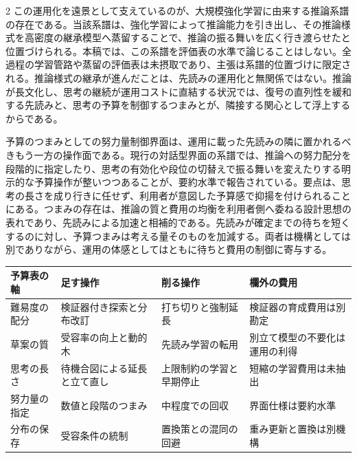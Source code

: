 \documentclass[lualatex,a4paper,10pt]{jlreq}
\begin{document}
\begin{multicols}{2}
この運用化を遠景として支えているのが、大規模強化学習に由来する推論系譜の存在である。当該系譜は、強化学習によって推論能力を引き出し、その推論様式を高密度の継承模型へ蒸留することで、推論の振る舞いを広く行き渡らせたと位置づけられる\autocite{r1}。本稿では、この系譜を評価表の水準で論じることはしない。全過程の学習管路や蒸留の評価表は未摂取であり、主張は系譜的位置づけに限定される。推論様式の継承が進んだことは、先読みの運用化と無関係ではない。推論が長文化し、思考の継続が運用コストに直結する状況では、復号の直列性を緩和する先読みと、思考の予算を制御するつまみとが、隣接する関心として浮上するからである。

予算のつまみとしての努力量制御界面は、運用に載った先読みの隣に置かれるべきもう一方の操作面である。現行の対話型界面の系譜では、推論への努力配分を段階的に指定したり、思考の有効化や段位の切替えで振る舞いを変えたりする明示的な予算操作が整いつつあることが、要約水準で報告されている\autocite{effortbind}。要点は、思考の長さを成り行きに任せず、利用者が意図した予算感で抑揚を付けられることにある。つまみの存在は、推論の質と費用の均衡を利用者側へ委ねる設計思想の表れであり、先読みによる加速と相補的である。先読みが確定までの待ちを短くするのに対し、予算つまみは考える量そのものを加減する。両者は機構としては別でありながら、運用の体感としてはともに待ちと費用の制御に寄与する。

\end{multicols}

\begin{center}
\small
\begin{tabularx}{\textwidth}{@{}p{}p{}p{}X@{}}
\toprule
予算表の軸 & 足す操作 & 削る操作 & 欄外の費用 \\
\midrule
難易度の配分 & 検証器付き探索と分布改訂 & 打ち切りと強制延長 & 検証器の育成費用は別勘定 \\
草案の質 & 受容率の向上と動的木 & 先読み学習の転用 & 別立て模型の不要化は運用の利得 \\
思考の長さ & 待機合図による延長と立て直し & 上限制約の学習と早期停止 & 短縮の学習費用は未抽出 \\
努力量の指定 & 数値と段階のつまみ & 中程度での回収 & 界面仕様は要約水準 \\
分布の保存 & 受容条件の統制 & 置換策との混同の回避 & 重み更新と置換は別機構 \\
\bottomrule
\end{tabularx}
\end{center}
\autocite{specdecode,eagle,mtp,snell2024,s1,thinkprune,overthink,effortbind}
\end{document}
